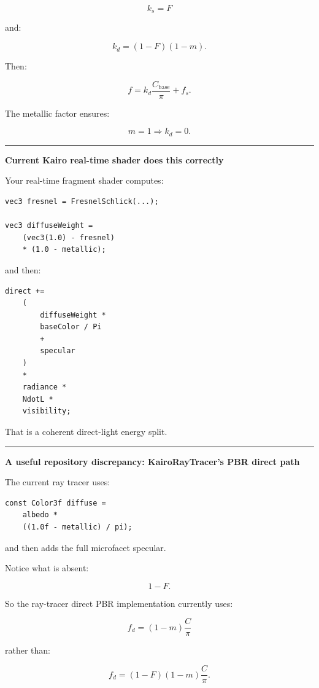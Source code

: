 \[
\boxed{
k_s=F
}
\]

and:

\[
\boxed{
k_d=(1-F)(1-m).
}
\]

Then:

\[
f=
k_d\frac{C_{\text{base}}}{\pi}
+
f_s.
\]

The metallic factor ensures:

\[
m=1
\Rightarrow
k_d=0.
\]

\begin{center}\rule{0.5\linewidth}{0.5pt}\end{center}

\textbf{Current Kairo real-time shader does this correctly}

Your real-time fragment shader computes:

\begin{verbatim}
vec3 fresnel = FresnelSchlick(...);

vec3 diffuseWeight =
    (vec3(1.0) - fresnel)
    * (1.0 - metallic);
\end{verbatim}

and then:

\begin{verbatim}
direct +=
    (
        diffuseWeight *
        baseColor / Pi
        +
        specular
    )
    *
    radiance *
    NdotL *
    visibility;
\end{verbatim}

That is a coherent direct-light energy split.

\begin{center}\rule{0.5\linewidth}{0.5pt}\end{center}

\textbf{A useful repository discrepancy: KairoRayTracer's PBR direct path}

The current ray tracer uses:

\begin{verbatim}
const Color3f diffuse =
    albedo *
    ((1.0f - metallic) / pi);
\end{verbatim}

and then adds the full microfacet specular.

Notice what is absent:

\[
1-F.
\]

So the ray-tracer direct PBR implementation currently uses:

\[
f_d=
(1-m)\frac{C}{\pi}
\]

rather than:

\[
f_d=
(1-F)(1-m)\frac{C}{\pi}.
\]

